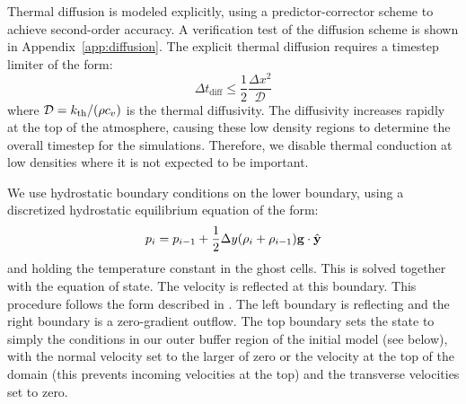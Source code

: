 \documentclass[trackchanges,preprint,times,tighten]{aastex63}
\newcommand{\gb}{{\bf{g}}}
\newcommand{\kth}{k_{\rm th}}
\begin{document}
Thermal diffusion is modeled explicitly, using a predictor-corrector
scheme to achieve second-order accuracy.  A verification test of the
diffusion scheme is shown in Appendix~\ref{app:diffusion}.  The
explicit thermal diffusion requires a timestep limiter of the form:
\begin{equation}
\Delta t_\mathrm{diff} \le \frac{1}{2} \frac{\Delta x^2}{\mathcal{D}}
\end{equation}
where $\mathcal{D} = \kth/(\rho c_v)$ is the thermal diffusivity.  The
diffusivity increases rapidly at the top of the atmosphere, causing
these low density regions to determine the overall timestep for the
simulations.  Therefore, we disable thermal conduction at low
densities where it is not expected to be important.

We use hydrostatic boundary conditions on the lower boundary, using
a discretized hydrostatic equilibrium equation of the form:
\begin{equation}
\label{eq:hse}
    p_i = p_{i-1} + \frac{1}{2} \Delta y (\rho_i + \rho_{i-1}) \gb \cdot \hat{\bf y}
\end{equation}
and holding the temperature constant in the ghost cells.  This is solved
together with the equation of state.  The velocity is reflected at this boundary.
This procedure follows the form described in \citet{ppm-hse}.  The
left boundary is reflecting and the right boundary is a zero-gradient
outflow.  The top boundary sets the state to simply the conditions
in our outer buffer region of the initial model (see below), with the
normal velocity set to the larger of zero or the velocity at the top
of the domain (this prevents incoming velocities at the top) and the
transverse velocities set to zero.
\end{document}
